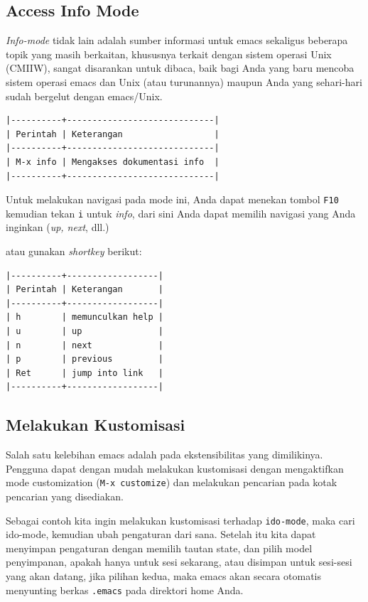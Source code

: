 \documentclass{article}
\begin{document}
\subsection{Access Info Mode}
\emph{Info-mode} tidak lain adalah sumber informasi untuk emacs sekaligus beberapa topik yang masih berkaitan, khususnya terkait dengan sistem operasi Unix 
(CMIIW), sangat disarankan untuk dibaca, baik bagi Anda yang baru mencoba 
sistem operasi emacs dan Unix (atau turunannya) maupun Anda yang sehari-hari 
sudah bergelut dengan emacs/Unix.

\begin{verbatim}
|----------+-----------------------------|
| Perintah | Keterangan                  |
|----------+-----------------------------|
| M-x info | Mengakses dokumentasi info  |
|----------+-----------------------------|
\end{verbatim}

Untuk melakukan navigasi pada mode ini, Anda dapat menekan tombol \verb=F10=
kemudian tekan \verb=i= untuk \emph{info}, dari sini Anda dapat memilih
navigasi yang Anda inginkan (\emph{up, next}, dll.)

atau gunakan \emph{shortkey} berikut:

\begin{verbatim}
|----------+------------------|
| Perintah | Keterangan       |
|----------+------------------|
| h        | memunculkan help |
| u        | up               |
| n        | next             |
| p        | previous         |
| Ret      | jump into link   |
|----------+------------------|
\end{verbatim}

\subsection{Melakukan Kustomisasi}
Salah satu kelebihan emacs adalah pada ekstensibilitas yang
dimilikinya. Pengguna dapat dengan mudah melakukan kustomisasi dengan
mengaktifkan mode customization (\verb=M-x customize=) dan melakukan
pencarian pada kotak pencarian yang disediakan.

Sebagai contoh kita ingin melakukan kustomisasi terhadap
\verb=ido-mode=, maka cari ido-mode, kemudian ubah pengaturan dari
sana. Setelah itu kita dapat menyimpan pengaturan dengan memilih
tautan state, dan pilih model penyimpanan, apakah hanya untuk sesi
sekarang, atau disimpan untuk sesi-sesi yang akan datang, jika pilihan
kedua, maka emacs akan secara otomatis menyunting berkas \verb=.emacs=
pada direktori home Anda.
\end{document}
